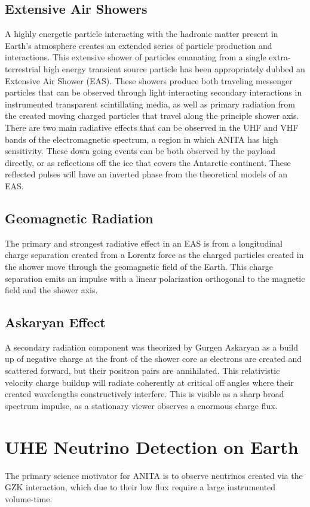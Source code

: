 	\subsection{Extensive Air Showers}
		A highly energetic particle interacting with the hadronic matter present in Earth's atmosphere creates an extended series of particle production and interactions.  This extensive shower of particles emanating from a single extra-terrestrial high energy transient source particle has been appropriately dubbed an Extensive Air Shower (EAS).  These showers produce both traveling messenger particles that can be observed through light interacting secondary interactions in instrumented transparent scintillating media, as well as primary radiation from the created moving charged particles that travel along the principle shower axis.  There are two main radiative effects that can be observed in the UHF and VHF bands of the electromagnetic spectrum, a region in which ANITA has high sensitivity.  These down going events can be both observed by the payload directly, or as reflections off the ice that covers the Antarctic continent.  These reflected pulses will have an inverted phase from the theoretical models of an EAS.
	\subsection{Geomagnetic Radiation}
		The primary and strongest radiative effect in an EAS is from a longitudinal charge separation created from a Lorentz force as the charged particles created in the shower move through the geomagnetic field of the Earth.  This charge separation emits an impulse with a linear polarization orthogonal to the magnetic field and the shower axis.
	\subsection{Askaryan Effect}
		A secondary radiation component was theorized by Gurgen Askaryan as a build up of negative charge at the front of the shower core as electrons are created and scattered forward, but their positron pairs are annihilated.  This relativistic velocity charge buildup will radiate coherently at critical off angles where their created wavelengths constructively interfere.  This is visible as a sharp broad spectrum impulse, as a stationary viewer observes a enormous charge flux.

\section{UHE Neutrino Detection on Earth}
	The primary science motivator for ANITA is to observe neutrinos created via the GZK interaction, which due to their low flux require a large instrumented volume-time.  
